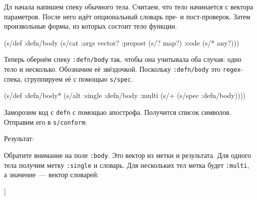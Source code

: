 Дл начала напишем спеку обычного тела. Считаем, что тело начинается с вектора
параметров. После него идёт опциональный словарь пре- и пост-проверок. Затем
произвольные формы, из которых состоит тело функции.

\begin{english}
  \begin{clojure}
(s/def :defn/body
  (s/cat :args vector?
         :prepost (s/? map?)
         :code (s/* any?)))
  \end{clojure}
\end{english}

Теперь обернём спеку \verb|:defn/body| так, чтобы она учитывала оба
случая: одно тело и несколько. Обозначим её звёздочкой. Поскольку
\verb|:defn/body| это \verb|regex|-спека, сгруппируем её с помощью
\verb|s/spec|.

\begin{english}
  \begin{clojure}
(s/def :defn/body*
  (s/alt :single :defn/body
         :multi (s/+ (s/spec :defn/body))))
  \end{clojure}
\end{english}


Заморозим код с \verb|defn| с помощью апострофа. Получится список
символов. Отправим его в \verb|s/conform|:

\begin{english}
\end{english}

\noindent
Результат:

\begin{english}
\end{english}

Обратите внимание на поле \verb|:body|. Это вектор из метки и результата. Для
одного тела получим метку \verb|:single| и словарь. Для нескольких тел метка
будет \verb|:multi|, а значение~--- вектор словарей:

\begin{english}
  \begin{clojure}
[:multi [{:args [x] :code [(println 1)]}
         {:args [x y] :code [(println 2)]}]]
  \end{clojure}
\end{english}

